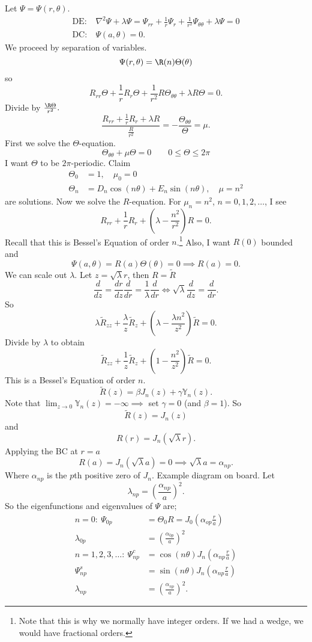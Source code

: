 \documentclass[cm]{article}
\newcommand{\Rtilde}{\tilde{R}}
\begin{document}
Let $\Psi = \Psi(r,\theta)$.
\begin{align*}
    \text{DE:}&~ \nabla^2\Psi + \lambda\Psi = \Psi_{rr} + \frac{1}{r} \Psi_r +
        \frac{1}{r^2} \Psi_{\theta \theta} + \lambda \Psi = 0 \\
    \text{DC:}&~ \Psi(a, \theta) = 0.
\end{align*}
We proceed by separation of variables.
    $$\Psi(r,\theta) = \R(n) \Theta(\theta)$$
so
    $$R_{rr} \Theta + \frac{1}{r} R_r \Theta + \frac{1}{r^2} R \Theta_{\theta
        \theta} + \lambda R \Theta = 0.$$
Divide by $\frac{\R \Theta}{r^2}.$
$$\frac{R_{rr} + \frac{1}{r} R_r + \lambda R}{\frac{R}{r^2}} = -
\frac{\Theta_{\theta \theta}}{\Theta} = \mu.$$
First we solve the $\Theta$-equation.
$$ \Theta_{\theta \theta} + \mu \Theta = 0 \qquad 0 \leq \Theta \leq 2 \pi$$
I want $\Theta$ to be $2\pi$-periodic.
Claim
\begin{align*}
\Theta_0 &= 1, \quad \mu_0 = 0 \\
\Theta_n &= D_n \cos(n \theta) + E_n \sin( n \theta), \quad \mu = n^2
\end{align*}
are solutions. Now we solve the $R$-equation. For $\mu_n = n^2$, $n = 0,1,2,
\ldots$, I see
    $$R_{rr} + \frac{1}{r} R_r + (\lambda - \frac{n^2}{r^2})R = 0.$$
Recall that this is Bessel's Equation of order $n$.\footnote{Note that this is
why we normally have integer orders. If we had a wedge, we would have
fractional orders.} Also, I want $R(0)$ bounded and
$$\Psi(a, \theta) = R(a) \Theta(\theta) = 0 \implies R(a) = 0.$$
We can scale out $\lambda$. Let $z = \sqrt{\lambda} r$, then $R = \Rtilde$
$$ \frac{d}{dz} = \frac{dr}{dz} \frac{d}{dr} = \frac{1}{\lambda} \frac{d}{dr}
\iff \sqrt{\lambda} \frac{d}{dz} = \frac{d}{dr}.$$
So
$$\lambda \Rtilde_{zz} + \frac{\lambda}{z}\Rtilde_z + \left( \lambda -
        \frac{\lambda n^2}{z^2}\right) \Rtilde = 0.$$
Divide by $\lambda$ to obtain
$$\Rtilde_{zz} + \frac{1}{z} \Rtilde_z + \left(1 - \frac{n^2}{z^2}\right)\Rtilde
= 0.$$
This is a Bessel's Equation of order $n$.
$$\Rtilde(z) = \beta J_n(z) + \gamma \mathbb Y_n(z).$$
Note that $\lim_{z \to 0} \mathbb Y_n(z) = -\infty \implies$ set
$\gamma = 0$ (and $\beta = 1$).
So
$$\tilde{R}(z) = J_n(z)$$
and
$$R(r) = J_n(\sqrt{\lambda}r).$$
Applying the BC at $r = a$
$$R(a) = J_n(\sqrt{\lambda} a) = 0 \implies \sqrt{\lambda} a = \alpha_{np}.$$
Where $\alpha_{np}$ is the $p$th positive zero of $J_n$. Example diagram on
board. Let
$$\lambda_{np} = \left( \frac{\alpha_{np}}{a}\right)^2.$$
So the eigenfunctions and eigenvalues of $\Psi$ are;
\begin{align*}
n = 0:~ \Psi_{0p} &= \Theta_0 R = J_0(\alpha_{op} \frac{r}{a}) \\
\lambda_{0p} &= \left( \frac{\alpha_{0p}}{a}\right)^2\\
n = 1,2,3, \ldots :~ \Psi_{np}^c &= \cos(n \theta) J_n ( \alpha_{np}
        \frac{r}{a})\\
\Psi_{np}^s &= \sin(n \theta) J_n ( \alpha_{np} \frac{r}{a}) \\
\lambda_{np} &= \left(\frac{\alpha_{np}}{a}\right)^2.
\end{align*}
\end{document}
